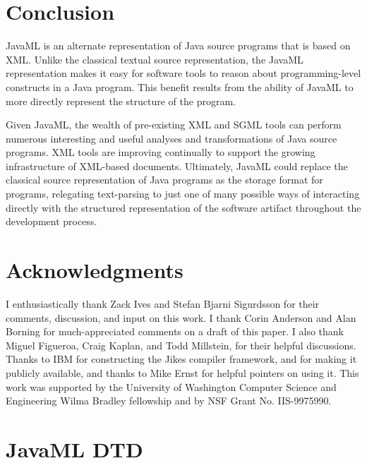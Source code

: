 \documentclass{article}
\begin{document}
\section{Conclusion}
\label{sec-conclusion}

JavaML is an alternate representation of Java source programs that is
based on XML.  Unlike the classical textual source representation, the
JavaML representation makes it easy for software tools to reason about
programming-level constructs in a Java program.  This benefit results from the
ability of JavaML to more directly represent the structure of the program.

Given JavaML, the wealth of pre-existing XML and SGML tools can perform
numerous interesting and useful analyses and transformations of Java
source programs.  XML tools are improving continually to support the
growing infrastructure of XML-based documents.  Ultimately, JavaML could
replace the classical source representation of Java programs as the
storage format for programs, relegating text-parsing to just one of many
possible ways of interacting directly with the structured representation
of the software artifact throughout the development process.

\section*{Acknowledgments}
\label{sec-ack}

I enthusiastically thank Zack Ives and Stefan Bjarni Sigurdsson for
their comments, discussion, and input on this work.  I thank Corin
Anderson and Alan Borning for much-appreciated comments on a draft of
this paper.  I also thank Miguel Figueroa, Craig Kaplan, and Todd
Millstein, for their helpful discussions. Thanks to IBM for constructing
the Jikes compiler framework, and for making it publicly available, and
thanks to Mike Ernst for helpful pointers on using it. This work was
supported by the University of Washington Computer Science and
Engineering Wilma Bradley fellowship and by NSF Grant No. IIS-9975990.

\appendix
\section{JavaML DTD}
\label{app-javaml-dtd}
\end{document}
